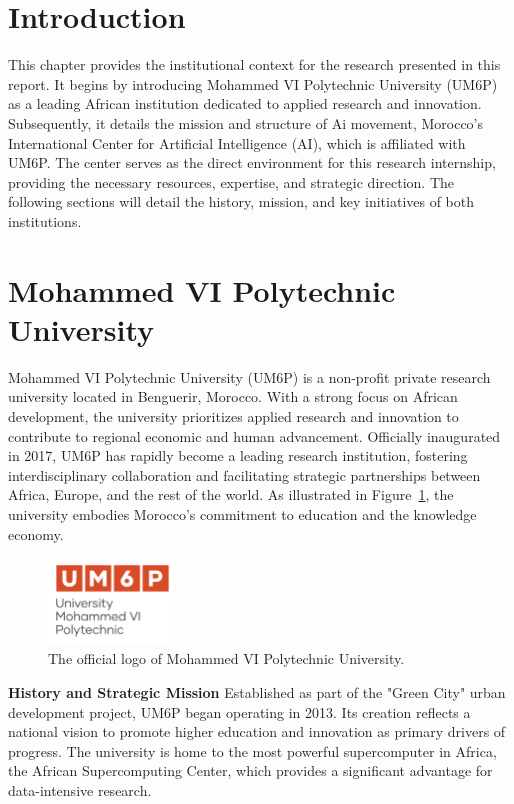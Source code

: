 \documentclass[../Main.tex]{subfiles}
\begin{document}
\section*{Introduction}

This chapter provides the institutional context for the research presented in this report. It begins by introducing Mohammed VI Polytechnic University (UM6P) as a leading African institution dedicated to applied research and innovation. Subsequently, it details the mission and structure of Ai movement, Morocco's International Center for Artificial Intelligence (AI), which is affiliated with UM6P. The center serves as the direct environment for this research internship, providing the necessary resources, expertise, and strategic direction. The following sections will detail the history, mission, and key initiatives of both institutions.

\section{Mohammed VI Polytechnic University}
Mohammed VI Polytechnic University (UM6P) is a non-profit private research university located in Benguerir, Morocco. With a strong focus on African development, the university prioritizes applied research and innovation to contribute to regional economic and human advancement. Officially inaugurated in 2017, UM6P has rapidly become a leading research institution, fostering interdisciplinary collaboration and facilitating strategic partnerships between Africa, Europe, and the rest of the world. As illustrated in Figure~\ref{fig:um6p_logo}, the university embodies Morocco's commitment to education and the knowledge economy.

\begin{figure}[H]
    \centering
    \includegraphics[width=0.3\textwidth]{img/logo/um6p.png}
    \caption{The official logo of Mohammed VI Polytechnic University.}
    \label{fig:um6p_logo}
\end{figure}

\textbf{History and Strategic Mission}
Established as part of the "Green City" urban development project, UM6P began operating in 2013. Its creation reflects a national vision to promote higher education and innovation as primary drivers of progress. The university is home to the most powerful supercomputer in Africa, the African Supercomputing Center, which provides a significant advantage for data-intensive research.
\end{document}
